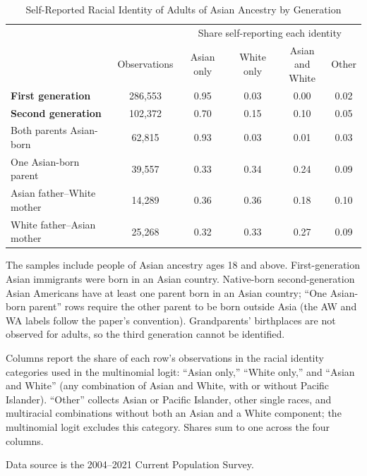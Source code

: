 \begin{table}[H]
\centering
\small{}
\caption{Self-Reported Racial Identity of Adults of Asian Ancestry by Generation \label{tab:asianbygen-adults}}
\begin{threeparttable}
\begin{tabular}{lccccc}
\toprule
 & & \multicolumn{4}{c}{Share self-reporting each identity} \\
\cmidrule(l{3pt}r{3pt}){3-6}
 & Observations & Asian only & White only & \specialcell{Asian and \\ White} & Other\\
\midrule
\textbf{First generation} & 286,553 & 0.95 & 0.03 & 0.00 & 0.02\\
\textbf{Second generation} & 102,372 & 0.70 & 0.15 & 0.10 & 0.05\\
\hspace{1em}Both parents Asian-born & 62,815 & 0.93 & 0.03 & 0.01 & 0.03\\
\hspace{1em}One Asian-born parent & 39,557 & 0.33 & 0.34 & 0.24 & 0.09\\
\hspace{1em}\hspace{1em}Asian father--White mother & 14,289 & 0.36 & 0.36 & 0.18 & 0.10\\
\hspace{1em}\hspace{1em}White father--Asian mother & 25,268 & 0.32 & 0.33 & 0.27 & 0.09\\
\bottomrule
\end{tabular}
\begin{tablenotes}
\small
\item[1] The samples include people of Asian ancestry ages 18 and above. First-generation Asian immigrants were born in an Asian country. Native-born second-generation Asian Americans have at least one parent born in an Asian country; ``One Asian-born parent'' rows require the other parent to be born outside Asia (the AW and WA labels follow the paper's convention). Grandparents' birthplaces are not observed for adults, so the third generation cannot be identified.
\item[2] Columns report the share of each row's observations in the racial identity categories used in the multinomial logit: ``Asian only,'' ``White only,'' and ``Asian and White'' (any combination of Asian and White, with or without Pacific Islander). ``Other'' collects Asian or Pacific Islander, other single races, and multiracial combinations without both an Asian and a White component; the multinomial logit excludes this category. Shares sum to one across the four columns.
\item[3] Data source is the 2004--2021 Current Population Survey.
\end{tablenotes}
\end{threeparttable}
\end{table}
